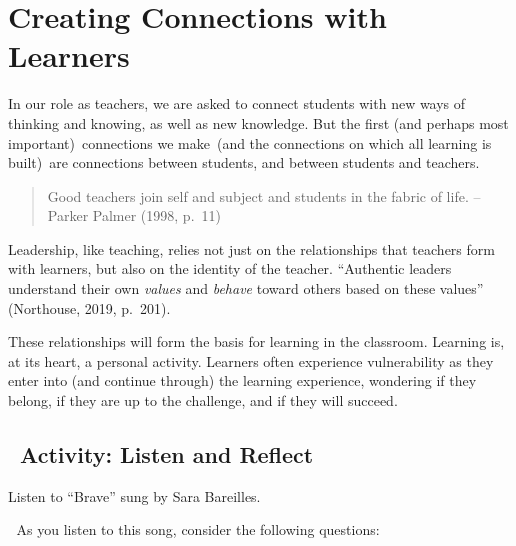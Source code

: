 \documentclass[
]{book}
\begin{document}
\hypertarget{creating-connections-with-learners}{%
\section{Creating Connections with Learners}\label{creating-connections-with-learners}}

In our role as teachers, we are asked to connect students with new ways of thinking and knowing, as well as new knowledge. But the first (and perhaps most important)~connections we make~(and the connections on which all learning is built)~are connections between students, and between students and teachers.

\begin{quote}
Good teachers join self and subject and students in the fabric of life. -- Parker Palmer (1998, p.~11)
\end{quote}

Leadership, like teaching, relies not just on the relationships that teachers form with learners, but also on the identity of the teacher. ``Authentic leaders understand their own \emph{values} and \emph{behave} toward others based on these values'' (Northouse, 2019, p.~201).

These relationships will form the basis for learning in the classroom. Learning is, at its heart, a personal activity. Learners often experience vulnerability as they enter into (and continue through) the learning experience, wondering if they belong, if they are up to the challenge, and if they will succeed.

\hypertarget{activity-listen-and-reflect}{%
\subsection{~Activity: Listen and Reflect}\label{activity-listen-and-reflect}}

\begin{video}
Listen to ``Brave'' sung by Sara Bareilles.

💭 As you listen to this song, consider the following questions:

\end{video}
\end{document}
